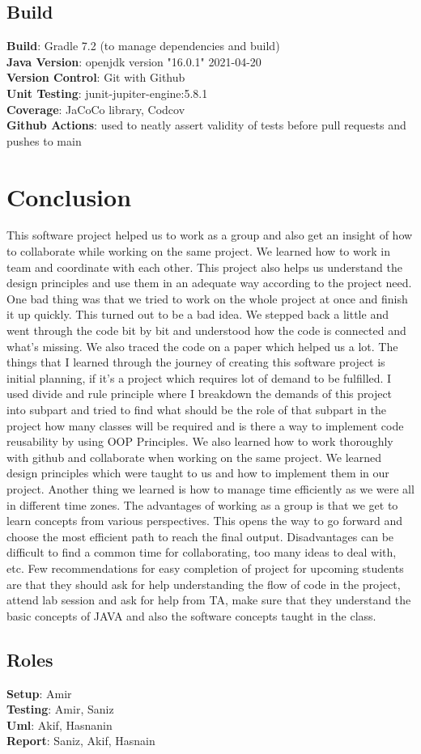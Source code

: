 \documentclass[12pt, dvipsnames, a4paper]{article}
\begin{document}
\subsection{Build}
\textbf{Build}: Gradle 7.2 (to manage dependencies and build)\\
\textbf{Java Version}: openjdk version "16.0.1" 2021-04-20\\
\textbf{Version Control}: Git with Github \\
\textbf{Unit Testing}: junit-jupiter-engine:5.8.1\\
\textbf{Coverage}: JaCoCo library, Codcov\\
\textbf{Github Actions}: used to neatly assert validity of tests before pull requests and pushes to main
\clearpage

\section{Conclusion}
This software project helped us to work as a group and also get an insight of how to collaborate while working on the same project.
We learned how to work in team and coordinate with each other. This project also helps us understand the design principles and use
them in an adequate way according to the project need. One bad thing was that we tried to work on the whole project at once and finish
it up quickly. This turned out to be a bad idea. We stepped back a little and went through the code bit by bit and understood how the
code is connected and what’s missing. We also traced the code on a paper which helped us a lot. The things that I learned through the
journey of creating this software project is initial planning, if it’s a project which requires lot of demand to be fulfilled. I used
divide and rule principle where I breakdown the demands of this project into subpart and tried to find what should be the role of that
subpart in the project how many classes will be required and is there a way to implement code reusability by using OOP Principles. We also
learned how to work thoroughly with github and collaborate when working on the same project. We learned design principles which were taught
to us and how to implement them in our project. Another thing we learned is how to manage time efficiently as we were all in different time zones.
The advantages of working as a group is that we get to learn concepts from various perspectives. This opens the way to go forward and choose the
most efficient path to reach the final output. Disadvantages can be difficult to find a common time for collaborating, too many ideas to deal with, etc.
Few recommendations for easy completion of project for upcoming students are that they should ask for help understanding the flow of code
in the project, attend lab session and ask for help from TA, make sure that they understand the basic concepts of JAVA and also the software
concepts taught in the class.

\subsection{Roles}
\textbf{Setup}: Amir\\
\textbf{Testing}: Amir, Saniz\\
\textbf{Uml}: Akif, Hasnanin\\
\textbf{Report}: Saniz, Akif, Hasnain\\
\end{document}
